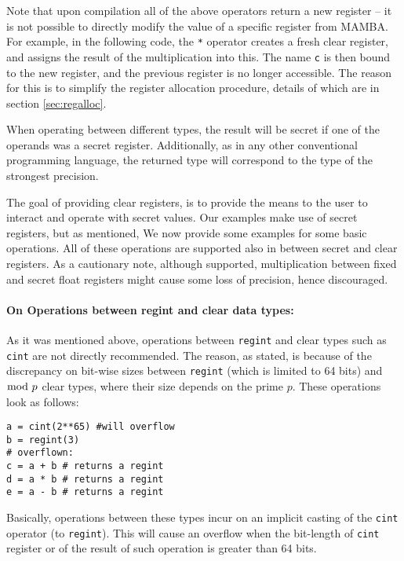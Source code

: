 Note that upon compilation all of the above operators return a 
new register -- it is not possible to directly modify the value 
of a specific register from MAMBA.
For example, in the following code, the \verb|*| operator creates a
fresh clear register, and assigns the result of the multiplication into this.
The name \verb|c| is then bound to the new register, and the previous
register is no longer accessible. The reason for this is to simplify the
register allocation procedure, details of which are in section
\ref{sec:regalloc}.

When operating between different types, the result will be 
secret if one of the operands was a secret register. 
Additionally, as in any other conventional programming language, 
the returned type will correspond to the type of the strongest precision. 

The goal of providing clear registers, is to provide the means 
to the user to interact and operate with secret values. 
Our examples make use of secret registers, but as mentioned, 
We now provide some examples for some basic operations. 
All of these operations are supported also in between secret and clear registers.
As a cautionary note, although supported, 
multiplication between fixed and secret float registers 
might cause some loss of precision, hence discouraged.

\paragraph{On Operations between regint and clear data types:} As it was mentioned above, operations between \verb|regint| and clear types such as \verb|cint| are not directly recommended. The reason, as stated, is because of the discrepancy on bit-wise sizes between \verb|regint| (which is limited to 64 bits) and $\bmod \; p$ clear types, where their size depends on the prime $p$. These operations look as follows:
\begin{lstlisting}
a = cint(2**65) #will overflow
b = regint(3)
# overflown:
c = a + b # returns a regint
d = a * b # returns a regint
e = a - b # returns a regint
\end{lstlisting}
Basically, operations between these types incur on an implicit casting of the \verb|cint| operator (to \verb|regint|). This will cause an overflow when the bit-length of \verb|cint| register or of the result of such operation is greater than 64 bits.

